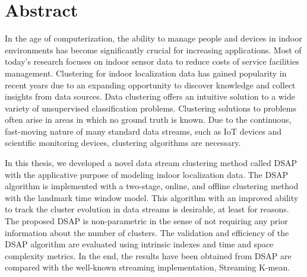 \doublespacing
\setlength{\parindent}{2em}

\chapter*{Abstract}





In the age of computerization, the ability to manage people and devices in indoor environments has become significantly crucial for increasing applications. Most of today’s research focuses on indoor sensor data to reduce costs of service facilities management. 
Clustering for indoor localization data has gained popularity in recent years due to an expanding opportunity to discover knowledge and collect insights from data sources. Data clustering offers an intuitive
solution to a wide variety of unsupervised classification problems. Clustering solutions to problems often arise in areas in which no ground truth is known. Due to the continuous, fast-moving nature of many standard data streams, such as IoT devices and scientific monitoring devices, clustering algorithms are necessary.

In this thesis, we developed a novel data stream clustering method called DSAP with the applicative purpose of modeling indoor localization data. The DSAP algorithm is implemented with a two-stage, online, and offline clustering method with the landmark time window model.  This algorithm with an improved ability to track the cluster evolution in data streams is desirable, at least for reasons.
The proposed DSAP is non-parametric in the sense of not requiring any prior information about the number of clusters. The validation and efficiency of the DSAP algorithm are evaluated using intrinsic indexes and time and space complexity metrics.
In the end, the results have been obtained from DSAP are compared with the well-known streaming implementation, Streaming K-mean. 



